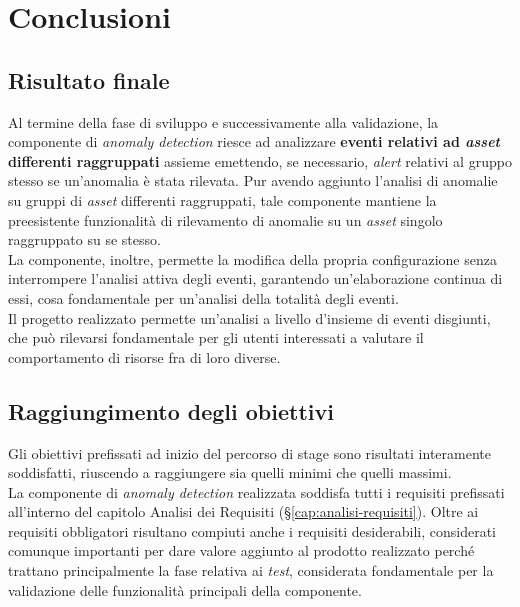 
\chapter{Conclusioni}
\label{cap:conclusioni}


\section{Risultato finale}
Al termine della fase di sviluppo e successivamente alla validazione, la componente di \textit{anomaly detection} riesce ad analizzare \textbf{eventi relativi ad \textit{asset} differenti raggruppati} assieme emettendo, se necessario, \textit{alert} relativi al gruppo stesso se un'anomalia è stata rilevata. Pur avendo aggiunto l'analisi di anomalie su gruppi di \textit{asset} differenti raggruppati, tale componente mantiene la preesistente funzionalità di rilevamento di anomalie su un \textit{asset} singolo raggruppato su se stesso.\\
La componente, inoltre, permette la modifica della propria configurazione senza interrompere l'analisi attiva degli eventi, garantendo un'elaborazione continua di essi, cosa fondamentale per un'analisi della totalità degli eventi.\\
Il progetto realizzato permette un'analisi a livello d'insieme di eventi disgiunti, che può rilevarsi fondamentale per gli utenti interessati a valutare il comportamento di risorse fra di loro diverse.

\section{Raggiungimento degli obiettivi}
Gli obiettivi prefissati ad inizio del percorso di stage sono risultati interamente soddisfatti, riuscendo a raggiungere sia quelli minimi che quelli massimi.\\
La componente di \textit{anomaly detection} realizzata soddisfa tutti i requisiti prefissati all'interno del capitolo Analisi dei Requisiti (\S\ref{cap:analisi-requisiti}). Oltre ai requisiti obbligatori risultano compiuti anche i requisiti desiderabili, considerati comunque importanti per dare valore aggiunto al prodotto realizzato perché trattano principalmente la fase relativa ai \textit{test}, considerata fondamentale per la validazione delle funzionalità principali della componente.

